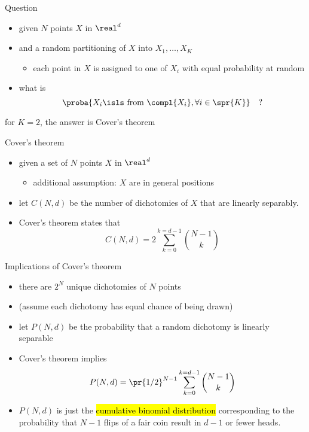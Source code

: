 \begin{frame}{Question}

  \begin{itemize}[<+->]
  \item given $N$ points $X$ in $\real^d$
  \item[] {and a random partitioning of $X$ into $X_1, \ldots, X_K$
      \begin{itemize}
      \item each point in $X$ is assigned to one of $X_i$ with equal probability at random
      \end{itemize}
    }
  \item {
       what is
      \[\proba{X_i \isls \text{ from } \compl{X_i}, \forall i\in\spr{K}}\quad?\]
  }
  \end{itemize}
  \pause
   for $K=2$, the answer is Cover's theorem


\end{frame}

\begin{frame}{Cover's theorem}
  \begin{itemize}[<+->]
  \item  {given a set of $N$ points $X$ in $\real^{d}$
      \begin{itemize}
      \item additional assumption: $X$ are in general positions
      \end{itemize}
    }
  \item   let $C(N, d)$ be the number of dichotomies of $X$ that are linearly separably.
  \item {  Cover's theorem states that
      \[
        C(N, d) = 2 \sum\limits_{k=0}^{k=d-1}\binom{N-1}{k}
      \]
    }
  \end{itemize}  
      
\end{frame}

\begin{frame}{Implications of Cover's theorem}
  \begin{itemize}[<+->]
  \item there are $2^N$ unique dichotomies of $N$ points
  \item (assume each dichotomy has equal chance of being drawn)
  \item {let $P(N, d)$ be the probability that a random dichotomy is linearly separable}
  \item {Cover's theorem implies
      \[
        P(N, d) = \pr{1/2}^{N-1} \sum\limits_{k=0}^{k=d-1}\binom{N-1}{k}
      \]
    }
  \item $P(N, d)$ is just the \hl{cumulative binomial distribution} corresponding to the probability that $N-1$ flips of a fair coin result in $d-1$ or fewer heads. 
  \end{itemize}
\end{frame}


